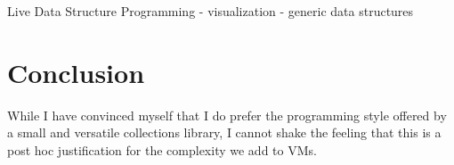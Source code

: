 \documentclass[sigconf, 10pt]{acmart}
\begin{document}
Live Data Structure Programming \citep{Oka:2017:LDS}
- visualization
- generic data structures

\section{Conclusion}



While I have convinced myself
that I do prefer the programming style offered
by a small and versatile collections library,
I cannot shake the feeling
that this is a post hoc justification
for the complexity we add to VMs.






\end{document}
